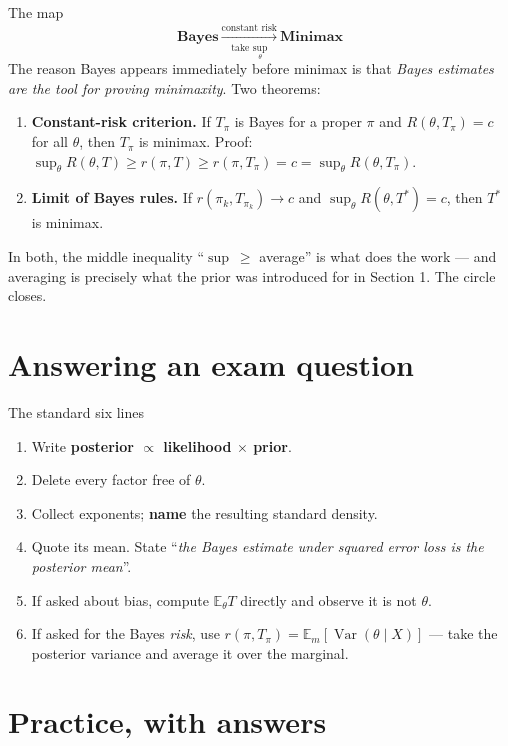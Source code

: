 \documentclass[11pt]{article}
\newcommand{\E}{\mathbb{E}}
\newcommand{\Var}{\operatorname{Var}}
\begin{document}
\begin{idea}{The map}
\[
\textbf{Bayes}\ \xrightarrow[\text{take }\sup_\theta]{\text{constant risk}}\ \textbf{Minimax}
\]
The reason Bayes appears immediately before minimax is that \emph{Bayes estimates are the tool
for proving minimaxity}. Two theorems:
\begin{enumerate}
\item \textbf{Constant-risk criterion.} If $T_\pi$ is Bayes for a proper $\pi$ and
$R(\theta,T_\pi)=c$ for all $\theta$, then $T_\pi$ is minimax. Proof:
$\sup_\theta R(\theta,T)\ge r(\pi,T)\ge r(\pi,T_\pi)=c=\sup_\theta R(\theta,T_\pi)$.
\item \textbf{Limit of Bayes rules.} If $r(\pi_k,T_{\pi_k})\to c$ and
$\sup_\theta R(\theta,T^*)=c$, then $T^*$ is minimax.
\end{enumerate}
In both, the middle inequality ``$\sup\ \ge$ average'' is what does the work --- and averaging
is precisely what the prior was introduced for in Section 1. The circle closes.
\end{idea}

\section{Answering an exam question}

\begin{recipe}{The standard six lines}
\begin{enumerate}
\item Write \textbf{posterior $\propto$ likelihood $\times$ prior}.
\item Delete every factor free of $\theta$.
\item Collect exponents; \textbf{name} the resulting standard density.
\item Quote its mean. State ``\emph{the Bayes estimate under squared error loss is the
posterior mean}''.
\item If asked about bias, compute $\E_\theta T$ directly and observe it is not $\theta$.
\item If asked for the Bayes \emph{risk}, use $r(\pi,T_\pi)=\E_m[\Var(\theta\mid X)]$ --- take
the posterior variance and average it over the marginal.
\end{enumerate}
\end{recipe}

\section{Practice, with answers}
\end{document}

